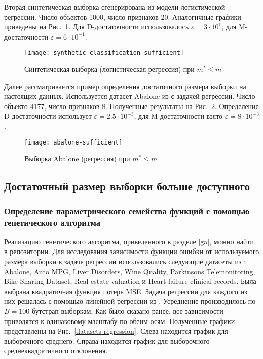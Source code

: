 Вторая синтетическая выборка сгенерирована из модели логистической регрессии. Число объектов 1000, число признаков 20. Аналогичные графики приведены на Рис.~\ref{synthetic-classification-sufficient}. Для D-достаточности использовалось $\varepsilon = 3 \cdot 10^1$, для M-достаточности $\varepsilon = 6 \cdot 10^{-1}$.

\begin{figure}[h!]
    \centering
    \texttt{[image: synthetic-classification-sufficient]}
    \caption{Синтетическая выборка (логистическая регрессия) при $m^* \leqslant m$}
    \label{synthetic-classification-sufficient}
\end{figure}

Далее рассматривается пример определения достаточного размера выборки на настоящих данных. Используется датасет Abalone из \citep{UCI} с задачей регрессии. Число объекто 4177, число признаков 8. Полученные результаты на Рис.~\ref{abalone-sufficient}. Определение D-достаточности использует $\varepsilon=2.5 \cdot 10^{-3}$, для M-достаточности взято $\varepsilon=8 \cdot 10^{-3}$.

\begin{figure}[h!]
    \centering
    \texttt{[image: abalone-sufficient]}
    \caption{Выборка Abalone (регрессия) при $m^* \leqslant m$}
    \label{abalone-sufficient}
\end{figure}

\subsection{Достаточный размер выборки больше доступного}

\subsubsection{Определение параметрического семейства функций с помощью генетического алгоритма}

Реализацию генетического алгоритма, приведенного в разделе \ref{ga}, можно найти в \href{https://github.com/kisnikser/Bayesian-Sample-Size-Estimation/tree/main/code/genetic_algorithm}{репозитории}. Для исследования зависимости функции ошибки от используемого размера выборки в задаче регрессии использовались следующие датасеты из \citep{UCI}: Abalone, Auto MPG, Liver Disorders, Wine Quality, Parkinsons Telemonitoring, Bike Sharing Dataset, Real estate valuation и Heart failure clinical records. Была выбрана квадратичная функция потерь MSE. Задача регрессии для каждого из них решалась с помощью линейной регрессии из \citep{scikit-learn}. Усреднение производилось по $B = 100$ бутстрап-выборкам. Как было сказано ранее, все зависимости приводятся к одинаковому масштабу по обеим осям. Полученные графики представлены на Рис.~\ref{datasets-regression}. Слева находится график для выборочного среднего. Справа находится график для выборочного среднеквадратичного отклонения.

